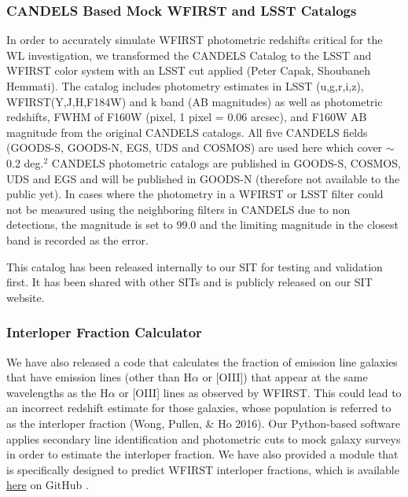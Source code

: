 \subsubsection{CANDELS Based Mock WFIRST and LSST Catalogs}

In order to accurately simulate WFIRST photometric redshifts critical for the WL investigation, we transformed the CANDELS Catalog to the LSST and WFIRST color system with an LSST cut applied (Peter Capak, Shoubaneh Hemmati). The catalog includes photometry estimates in LSST (u,g,r,i,z), WFIRST(Y,J,H,F184W) and k band (AB magnitudes) as well as photometric redshifts, FWHM of F160W (pixel, 1 pixel = 0.06 arcsec), and F160W AB magnitude from the original CANDELS catalogs. All five CANDELS fields (GOODS-S, GOODS-N, EGS, UDS and COSMOS) are used here which cover $\sim$ 0.2 deg.$^2$ CANDELS photometric catalogs are published in GOODS-S, COSMOS, UDS and EGS and will be published in GOODS-N (therefore not available to the public yet). In cases where the photometry in a WFIRST or LSST filter could not be measured using the neighboring filters in CANDELS due to non detections, the magnitude is set to 99.0 and the limiting magnitude in the closest band is recorded as the error.

This catalog has been released internally to our SIT for testing and validation first. It has been shared with other SITs and is publicly released on our SIT website.

\subsubsection{Interloper Fraction Calculator}

We have also released a code that calculates the fraction of emission line galaxies that have emission lines (other than H$\alpha$ or [OIII]) that appear at the same wavelengths as the H$\alpha$ or [OIII] lines as observed by WFIRST. This could lead to an incorrect redshift estimate for those galaxies, whose population is referred to as the interloper fraction (Wong, Pullen, \& Ho 2016). Our Python-based software applies secondary line identification and photometric cuts to mock galaxy surveys in order to estimate the interloper fraction. We have also provided a module that is specifically designed to predict WFIRST interloper fractions, which is available \href{https://github.com/kazewong/Intercut}{here} on GitHub \citep{Wong:2016eku}.
